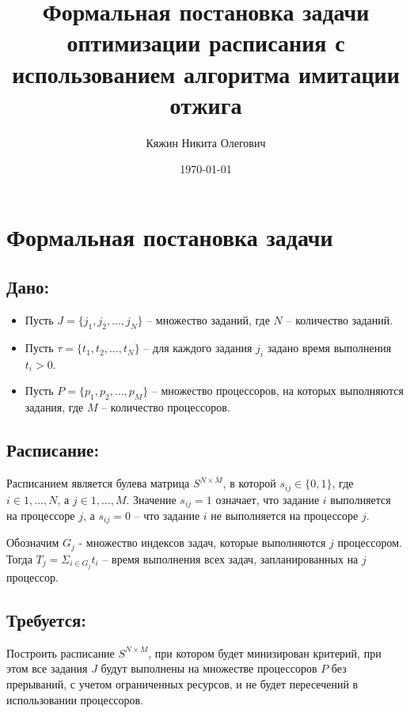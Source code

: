 \documentclass[openany, twoside, a4paper, 12pt]{extbook}
\begin{document}
\title{\textbf{Формальная постановка задачи оптимизации расписания с использованием алгоритма имитации отжига}}
\author{Кяжин Никита Олегович}
\date{\today}
\maketitle

\newpage
{}
\pagestyle{mystyle}

\section*{Формальная постановка задачи}

    \subsection*{Дано:}
        \begin{itemize}
            \item Пусть $J = \{j_1, j_2, \dots, j_N\}$ -- множество заданий, где $N$ -- количество заданий.
            \item Пусть $\tau  = \{t_1, t_2, \dots, t_N\}$ -- для каждого задания $j_i$ задано время выполнения $t_i > 0$.
            \item Пусть $P = \{p_1, p_2, \dots, p_M\}$ -- множество процессоров, на которых выполняются задания, где $M$ -- количество процессоров.
        \end{itemize}
    
    \subsection*{Расписание:}
        Расписанием является булева матрица $S^{N \times M}$, в которой $s_{ij} \in \{0, 1\}$, где $i \in {1, \dots, N}$, а $j \in {1, \dots, M}$. Значение $s_{ij} = 1$ означает,
        что задание $i$ выполняется на процессоре $j$, а $s_{ij} = 0$ -- что задание $i$ не выполняется на процессоре $j$.
        
        Обозначим $G_j$ - множество индексов задач, которые выполняются $j$ процессором. Тогда 
        $T_j = \Sigma_{i \in G_j}t_i$ -- время выполнения всех задач, запланированных на $j$ процессор.

    \subsection*{Требуется:}
        Построить расписание $S^{N \times M}$, при котором будет минизирован критерий, при этом все задания $J$ будут выполнены на множестве процессоров $P$ без прерываний,
        с учетом ограниченных ресурсов, и не будет пересечений в использовании процессоров.
\end{document}
